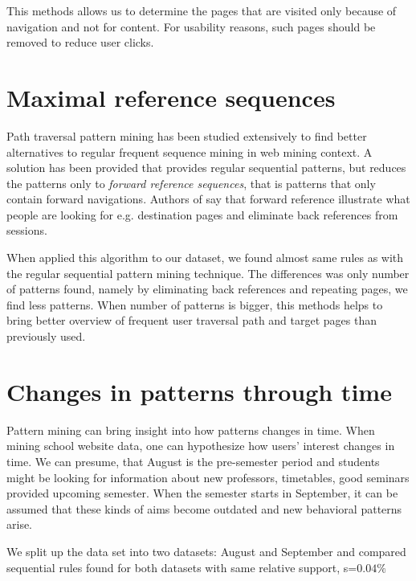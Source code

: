 \documentclass[english,a4paper]{article}
\begin{document}
This methods allows us to determine the pages that are visited only because of navigation and not for content. For usability reasons, such pages should be removed to reduce user clicks.





\section{Maximal reference sequences}
Path traversal pattern mining has been studied extensively to find better alternatives to regular frequent sequence mining in web mining context. A solution has been provided \cite{path_patterns} that provides regular sequential patterns, but reduces the patterns only to \emph{forward reference sequences}, that is patterns that only contain forward navigations. Authors of \cite{path_patterns} say that forward reference illustrate what people are looking for e.g. destination pages and eliminate back references from sessions.

When applied this algorithm to our dataset, we found almost same rules as with the regular sequential pattern mining technique. The differences was only number of patterns found, namely by eliminating back references and repeating pages, we find less patterns. When  number of patterns is bigger, this methods helps to bring better overview of frequent user traversal path and target pages than previously used.

\section{Changes in patterns through time} 
Pattern mining can bring insight into how patterns changes in time. When mining school website data, one can hypothesize how users' interest changes in time. We can presume, that August is the pre-semester period and students might be looking for information about new professors, timetables, good seminars provided upcoming semester. When the semester starts in September, it can be assumed that these kinds of aims become outdated and new behavioral patterns arise.

We split up the data set into two datasets: August and September and compared sequential rules found for both datasets with same relative support, s=$0.04\%$
\end{document}
